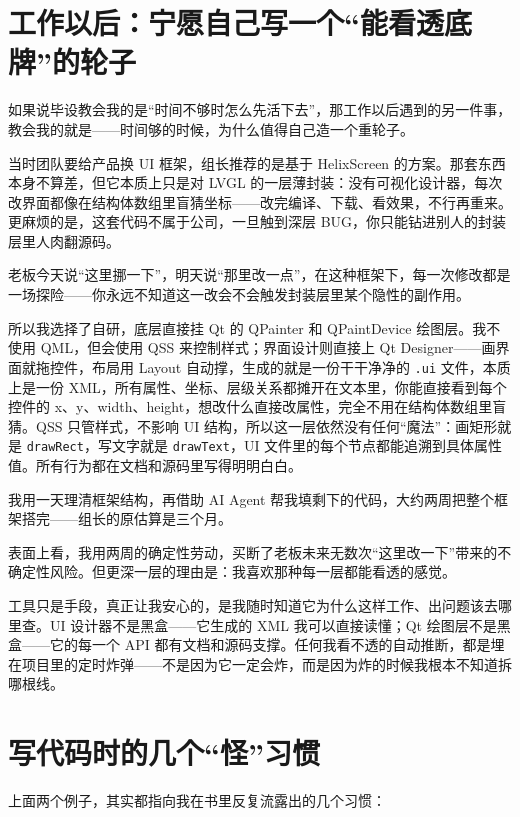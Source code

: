 \section{工作以后：宁愿自己写一个“能看透底牌”的轮子}

如果说毕设教会我的是“时间不够时怎么先活下去”，那工作以后遇到的另一件事，教会我的就是——时间够的时候，为什么值得自己造一个重轮子。

当时团队要给产品换 UI 框架，组长推荐的是基于 HelixScreen 的方案。那套东西本身不算差，但它本质上只是对 LVGL 的一层薄封装：没有可视化设计器，每次改界面都像在结构体数组里盲猜坐标——改完编译、下载、看效果，不行再重来。更麻烦的是，这套代码不属于公司，一旦触到深层 BUG，你只能钻进别人的封装层里人肉翻源码。

老板今天说“这里挪一下”，明天说“那里改一点”，在这种框架下，每一次修改都是一场探险——你永远不知道这一改会不会触发封装层里某个隐性的副作用。

所以我选择了自研，底层直接挂 Qt 的 QPainter 和 QPaintDevice 绘图层。我不使用 QML，但会使用 QSS 来控制样式；界面设计则直接上 Qt Designer——画界面就拖控件，布局用 Layout 自动撑，生成的就是一份干干净净的 \texttt{.ui} 文件，本质上是一份 XML，所有属性、坐标、层级关系都摊开在文本里，你能直接看到每个控件的 x、y、width、height，想改什么直接改属性，完全不用在结构体数组里盲猜。QSS 只管样式，不影响 UI 结构，所以这一层依然没有任何“魔法”：画矩形就是 \texttt{drawRect}，写文字就是 \texttt{drawText}，UI 文件里的每个节点都能追溯到具体属性值。所有行为都在文档和源码里写得明明白白。

我用一天理清框架结构，再借助 AI Agent 帮我填剩下的代码，大约两周把整个框架搭完——组长的原估算是三个月。

表面上看，我用两周的确定性劳动，买断了老板未来无数次“这里改一下”带来的不确定性风险。但更深一层的理由是：我喜欢那种每一层都能看透的感觉。

工具只是手段，真正让我安心的，是我随时知道它为什么这样工作、出问题该去哪里查。UI 设计器不是黑盒——它生成的 XML 我可以直接读懂；Qt 绘图层不是黑盒——它的每一个 API 都有文档和源码支撑。任何我看不透的自动推断，都是埋在项目里的定时炸弹——不是因为它一定会炸，而是因为炸的时候我根本不知道拆哪根线。

\section{写代码时的几个“怪”习惯}

上面两个例子，其实都指向我在书里反复流露出的几个习惯：

